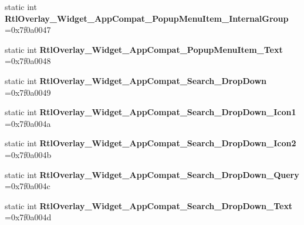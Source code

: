 \begin{DoxyCompactItemize}
\item 
\mbox{\label{classandroid_1_1support_1_1v7_1_1recyclerview_1_1R_1_1style_a661da71938a1cad70de4338bf77e32a5}} 
static int {\bfseries Rtl\+Overlay\+\_\+\+Widget\+\_\+\+App\+Compat\+\_\+\+Popup\+Menu\+Item\+\_\+\+Internal\+Group} =0x7f0a0047
\item 
\mbox{\label{classandroid_1_1support_1_1v7_1_1recyclerview_1_1R_1_1style_a9686b7fd0ae4ad33b98816be7f9bb7a5}} 
static int {\bfseries Rtl\+Overlay\+\_\+\+Widget\+\_\+\+App\+Compat\+\_\+\+Popup\+Menu\+Item\+\_\+\+Text} =0x7f0a0048
\item 
\mbox{\label{classandroid_1_1support_1_1v7_1_1recyclerview_1_1R_1_1style_a809e9701f83ab147795c849c891598ce}} 
static int {\bfseries Rtl\+Overlay\+\_\+\+Widget\+\_\+\+App\+Compat\+\_\+\+Search\+\_\+\+Drop\+Down} =0x7f0a0049
\item 
\mbox{\label{classandroid_1_1support_1_1v7_1_1recyclerview_1_1R_1_1style_a971e3bb69e73d03c33b4056d3f324719}} 
static int {\bfseries Rtl\+Overlay\+\_\+\+Widget\+\_\+\+App\+Compat\+\_\+\+Search\+\_\+\+Drop\+Down\+\_\+\+Icon1} =0x7f0a004a
\item 
\mbox{\label{classandroid_1_1support_1_1v7_1_1recyclerview_1_1R_1_1style_a30bfb2d41f36000d2ae0fdf2e4004930}} 
static int {\bfseries Rtl\+Overlay\+\_\+\+Widget\+\_\+\+App\+Compat\+\_\+\+Search\+\_\+\+Drop\+Down\+\_\+\+Icon2} =0x7f0a004b
\item 
\mbox{\label{classandroid_1_1support_1_1v7_1_1recyclerview_1_1R_1_1style_a8647bd43c0eb99a71f1af103cde663fc}} 
static int {\bfseries Rtl\+Overlay\+\_\+\+Widget\+\_\+\+App\+Compat\+\_\+\+Search\+\_\+\+Drop\+Down\+\_\+\+Query} =0x7f0a004c
\item 
\mbox{\label{classandroid_1_1support_1_1v7_1_1recyclerview_1_1R_1_1style_a961460977389f3c324ac25289e482801}} 
static int {\bfseries Rtl\+Overlay\+\_\+\+Widget\+\_\+\+App\+Compat\+\_\+\+Search\+\_\+\+Drop\+Down\+\_\+\+Text} =0x7f0a004d

\end{DoxyCompactItemize}
